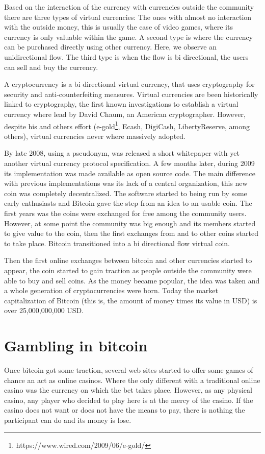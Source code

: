 \begin{intro}
Based on the interaction of the currency with currencies outside the
  community there are three types of virtual currencies: The ones with almost
  no interaction with the outside money, this is usually the case of video
  games, where its currency is only valuable within the game. A second
  type is where the currency can be purchased directly using other currency.
  Here, we observe an unidirectional flow. The third type is when the flow is
  bi directional, the users can sell and buy the currency. 
  
A cryptocurrency is a bi directional virtual currency, that uses cryptography
  for security and anti-counterfeiting measures. Virtual currencies are been
  historically linked to cryptography, the first known investigations
   to establish a virtual currency where lead by David
  Chaum, an American cryptographer. However, despite his and others effort
  (e-gold\footnote{https://www.wired.com/2009/06/e-gold/},
   Ecash,
   DigiCash, LibertyReserve, among others), virtual currencies never where
   massively adopted.
   
By late 2008, using a pseudonym, was released a short
  whitepaper with yet another virtual currency
  protocol specification. A few months later, during 2009 its implementation
  was made available as open source code. The main difference with previous
  implementations was its lack of a central organization, this new coin was
  completely decentralized. The software started to being run by some early
  enthusiasts and Bitcoin gave the step from an idea to an usable coin. The
  first years was the coins were exchanged for free among the community users.
  However, at some point the community was big enough and its members started
  to give value to the coin, then the first exchanges from and to other coins
  started to take place. Bitcoin transitioned into a bi directional flow
  virtual coin.

Then the first online exchanges between bitcoin and other currencies started
  to appear, the coin started to gain traction as people outside the community
  were able to buy and sell coins. As the money became popular, the idea was
  taken and a whole generation of cryptocurrencies were born. Today the
  market capitalization of Bitcoin (this is, the amount of money times its
  value in USD) is over 25,000,000,000 USD.
  
\section{Gambling in bitcoin}
Once bitcoin got some traction, several web sites started to offer some
  games of chance an act as online casinos. Where the only different with a
  traditional online casino was the currency on which the bet takes place.
However, as any physical casino, any player who decided to play here is at
  the mercy of the casino. If the casino does not want or does not have the
  means to pay, there is nothing the participant can do and its money is lose.
 

\end{intro}
